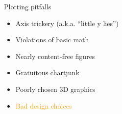 \documentclass[
  ignorenonframetext,
]{beamer}
\providecommand{\tightlist}{%
  \setlength{\itemsep}{0pt}\setlength{\parskip}{0pt}}
\begin{document}
\begin{frame}{}
\label{section-22}
\end{frame}

\begin{frame}{Plotting pitfalls}
\label{plotting-pitfalls-5}
\begin{itemize}
\tightlist
\item
  Axis trickery (a.k.a. ``little y lies'')
\item
  Violations of basic math
\item
  Nearly content-free figures
\item
  Gratuitous chartjunk
\item
  Poorly chosen 3D graphics
\item
  \textcolor{orange}{Bad design choices}
\end{itemize}
\end{frame}

\begin{frame}{}
\label{section-23}
\end{frame}
\end{document}
